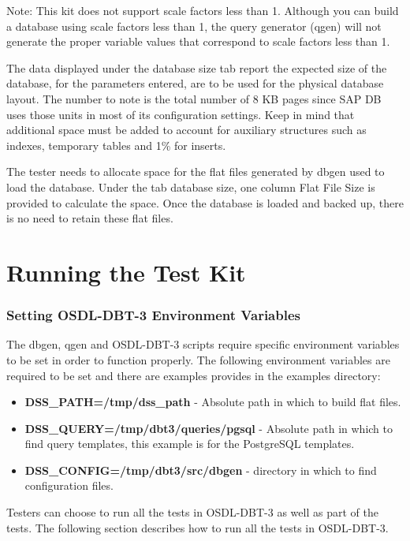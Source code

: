\documentclass{article}
\begin{document}
Note:  This kit does not support scale factors less than 1.  Although
you can build a database using scale factors less than 1, the query
generator (qgen) will not generate the proper variable values that
correspond to scale factors less than 1.

The data displayed under the database size tab report the expected
size of the database, for the parameters entered, are to be used for
the physical database layout.  The number to note is the total number
of 8 KB pages since SAP DB uses those units in most of its
configuration settings.  Keep in mind that additional space must be
added to account for auxiliary structures such as indexes, temporary
tables and 1\% for inserts.

The tester needs to allocate space for the flat files generated by
dbgen used to load the database.  Under the tab database size, one column Flat File Size is provided to calculate the
space.  Once the database is loaded and backed up, there is no need
to retain these flat files.  

\section{Running the Test Kit}

\subsubsection{Setting OSDL-DBT-3 Environment Variables}

The dbgen, qgen and OSDL-DBT-3 scripts require specific environment variables to be set in order to function properly.
The following environment variables are required to be set and there are examples provides
in the examples directory:
\begin{itemize}
\item \textbf{DSS\_PATH=/tmp/dss\_path} - Absolute path in which to build flat files.
\item \textbf{DSS\_QUERY=/tmp/dbt3/queries/pgsql} - Absolute path in which to find
      query templates, this example is for the PostgreSQL templates.
\item \textbf{DSS\_CONFIG=/tmp/dbt3/src/dbgen} - directory in which to find
      configuration files.
\end{itemize}

Testers can choose to run all the tests in OSDL-DBT-3 as well as part
of the tests.  The following section describes how to run all the
tests in OSDL-DBT-3.
\end{document}
